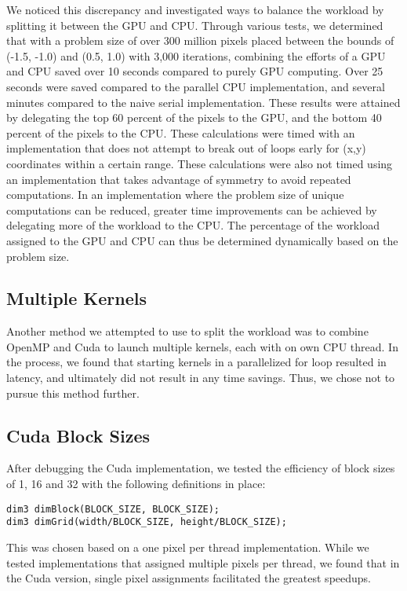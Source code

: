 \documentclass{article}
\begin{document}
We noticed this discrepancy and investigated ways to balance the workload by splitting it between the GPU and CPU.
Through various tests, we determined that with a problem size of over 300 million pixels placed between the bounds of (-1.5, -1.0) and (0.5, 1.0) with 3,000 iterations, combining the efforts of a GPU and CPU saved over 10 seconds compared to purely GPU computing.
Over 25 seconds were saved compared to the parallel CPU implementation, and several minutes compared to the naive serial implementation.
These results were attained by delegating the top 60 percent of the pixels to the GPU, and the bottom 40 percent of the pixels to the CPU.
These calculations were timed with an implementation that does not attempt to break out of loops early for (x,y) coordinates within a certain range.
These calculations were also not timed using an implementation that takes advantage of symmetry to avoid repeated computations.
In an implementation where the problem size of unique computations can be reduced, greater time improvements can be achieved by delegating more of the workload to the CPU.
The percentage of the workload assigned to the GPU and CPU can thus be determined dynamically based on the problem size.

\subsection{Multiple Kernels}

Another method we attempted to use to split the workload was to combine OpenMP and Cuda to launch multiple kernels, each with on own CPU thread.
In the process, we found that starting kernels in a parallelized for loop resulted in latency, and ultimately did not result in any time savings.
Thus, we chose not to pursue this method further.

\subsection{Cuda Block Sizes}

After debugging the Cuda implementation, we tested the efficiency of block sizes of 1, 16 and 32 with the following definitions in place: 

\begin{verbatim}
dim3 dimBlock(BLOCK_SIZE, BLOCK_SIZE); 
dim3 dimGrid(width/BLOCK_SIZE, height/BLOCK_SIZE);
\end{verbatim}

This was chosen based on a one pixel per thread implementation.
While we tested implementations that assigned multiple pixels per thread, we found that in the Cuda version, single pixel assignments facilitated the greatest speedups.
\end{document}
